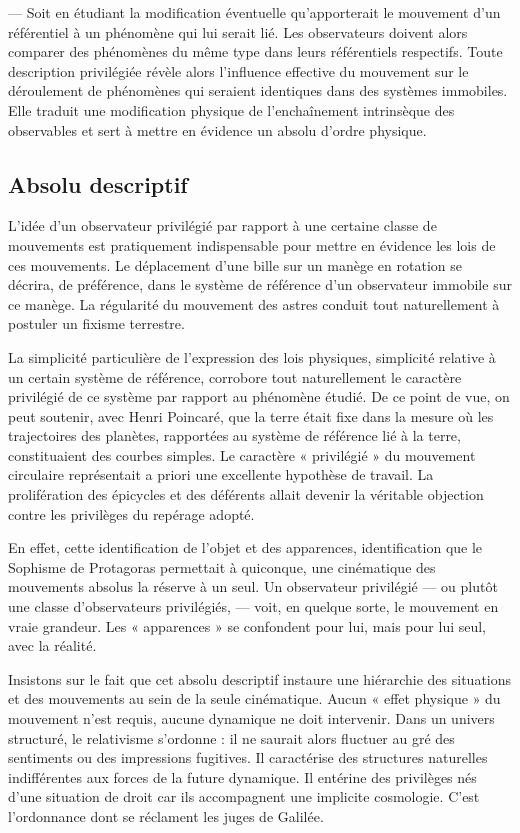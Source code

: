 — Soit en étudiant la modification éventuelle qu’apporterait le mouvement
d’un référentiel à un phénomène qui lui serait lié. Les observateurs
doivent alors comparer des phénomènes du même type dans leurs référentiels
respectifs. Toute description privilégiée révèle alors l’influence
effective du mouvement sur le déroulement de phénomènes qui seraient
identiques dans des systèmes immobiles. Elle traduit une modification
physique de l’enchaînement intrinsèque des observables et sert à mettre
en évidence un absolu d’ordre physique.

\subsection{Absolu descriptif}

L'idée d’un observateur privilégié par rapport à une certaine classe
de mouvements est pratiquement indispensable pour mettre en évidence
les lois de ces mouvements. Le déplacement d’une bille sur un manège
en rotation se décrira, de préférence, dans le système de référence d’un
observateur immobile sur ce manège. La régularité du mouvement des
astres conduit tout naturellement à postuler un fixisme terrestre.

La simplicité particulière de l’expression des lois physiques, simplicité
relative à un certain système de référence, corrobore tout naturellement
le caractère privilégié de ce système par rapport au phénomène étudié.
De ce point de vue, on peut soutenir, avec Henri Poincaré, que la
terre était fixe dans la mesure où les trajectoires des planètes, rapportées
au système de référence lié à la terre, constituaient des courbes simples.
Le caractère « privilégié » du mouvement circulaire représentait a priori
une excellente hypothèse de travail. La prolifération des épicycles et des
déférents allait devenir la véritable objection contre les privilèges du
repérage adopté.

En effet, cette identification de l’objet et des apparences, identification
que le Sophisme de Protagoras permettait à quiconque, une cinématique
des mouvements absolus la réserve à un seul. Un observateur
privilégié — ou plutôt une classe d’observateurs privilégiés, — voit, en
quelque sorte, le mouvement en vraie grandeur. Les « apparences » se
confondent pour lui, mais pour lui seul, avec la réalité.

Insistons sur le fait que cet absolu descriptif instaure une hiérarchie
des situations et des mouvements au sein de la seule cinématique. Aucun
« effet physique » du mouvement n’est requis, aucune dynamique ne doit
intervenir. Dans un univers structuré, le relativisme s’ordonne : il ne
saurait alors fluctuer au gré des sentiments ou des impressions fugitives.
Il caractérise des structures naturelles indifférentes aux forces de la
future dynamique. Il entérine des privilèges nés d’une situation de droit
car ils accompagnent une implicite cosmologie. C’est l’ordonnance dont
se réclament les juges de Galilée.

